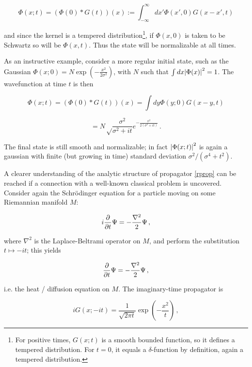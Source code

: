 \documentclass{article}
\newcommand{\intR}{\int_{-\infty}^\infty}
\begin{document}
\begin{equation}
    \Phi(x;t) = \left(\Phi(0) * G(t) \right)(x) := \intR dx' \Phi(x',0) G(x-x',t)
\end{equation}

and since the kernel is a tempered distribution\footnote{For positive times, $G(x;t)$ is a smooth bounded function, so it defines a tempered distribution. For $t=0$, it equals a $\delta$-function by definition, again a tempered distribution.}, if $\Phi(x,0)$ is taken to be Schwartz so will be $\Phi(x,t)$. Thus the state will be normalizable at all times.

As an instructive example, consider a more regular initial state, such as the Gaussian $\Phi(x;0) = N \exp(-\frac{x^2}{2\sigma^2} )$, with $N$ such that $\int dx \abs{\Phi(x)}^2 = 1$. The wavefunction at time $t$ is then

\begin{equation}
    \Phi(x;t) = \left( \Phi(0) * G(t) \right)(x) = \int dy \Phi(y;0) G(x-y,t)
\end{equation}

\begin{equation}
    = N \sqrt\frac{\sigma^2}{\sigma^2 + it} e^{-\frac{x^2}{2(\sigma^2 + it)}}\,.
\end{equation}

The final state is still smooth and normalizable; in fact $\abs{\Phi(x;t)}^2$ is again a gaussian with finite (but growing in time) standard deviation $\sigma^2/(\sigma^4 + t^2)$.

A clearer understanding of the analytic structure of propagator \eqref{rprop} can be reached if a connection with a well-known classical problem is uncovered. Consider again the Schr\"odinger equation for a particle moving on some Riemannian manifold $M$:

\begin{equation}
    i \pdv{t} \Psi = - \frac{\nabla^2}{2} \Psi\,,
\end{equation}

where $\nabla^2$ is the Laplace-Beltrami operator on $M$, and perform the substitution $t \mapsto -it$; this yields

\begin{equation}
    \pdv{t} \Psi = - \frac{\nabla^2}{2} \Psi\,,
\end{equation}

i.e. the heat / diffusion equation on $M$. The imaginary-time propagator is

\begin{equation}\label{imrprop}
    i G(x;-it) = \frac{1}{\sqrt{2\pi t}} \exp(-\frac{x^2}{t})\,,
\end{equation}
\end{document}
